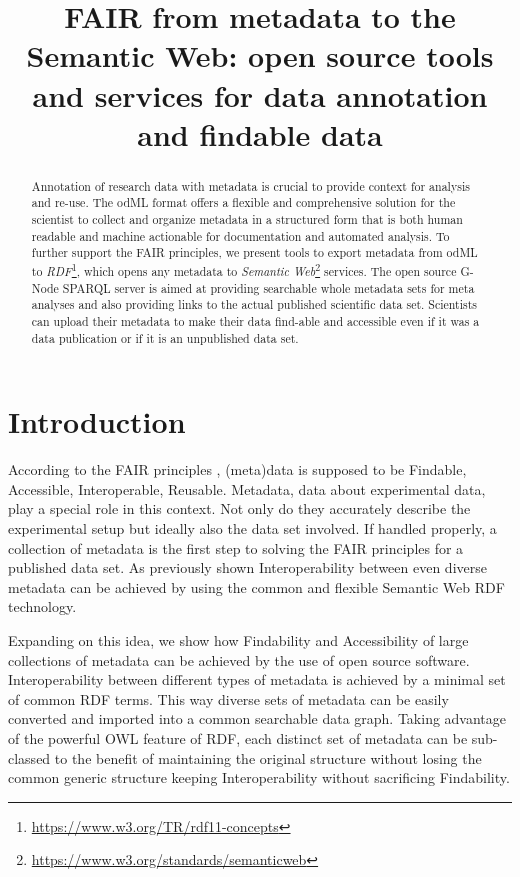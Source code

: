 \documentclass{article}
\title{FAIR from metadata to the Semantic Web: open source tools and services for data annotation and findable data}
\begin{document}
\maketitle

\begin{abstract}
Annotation of research data with metadata is crucial to provide context for analysis and  re-use. The odML format offers a flexible and comprehensive solution for the scientist to collect and organize metadata in a structured form that is both human readable and machine actionable for documentation and automated analysis. To further support the FAIR principles, we present tools to export metadata from odML to \textit{RDF}\footnote{\url{https://www.w3.org/TR/rdf11-concepts}}, which opens any metadata to \textit{Semantic Web}\footnote{\url{https://www.w3.org/standards/semanticweb}} services. The open source G-Node SPARQL server is aimed at providing searchable whole metadata sets for meta analyses and also providing links to the actual published scientific data set. Scientists can upload their metadata to make their data find-able and accessible even if it was a data publication or if it is an unpublished data set.
\end{abstract}

\section{Introduction} \label{sec:introduction}
According to the FAIR principles \cite{Wilkinson_2016}, (meta)data is supposed to be Findable, Accessible, Interoperable, Reusable. Metadata, data about experimental data, play a special role in this context. Not only do they accurately describe the experimental setup but ideally also the data set involved. If handled properly, a collection of metadata is the first step to solving the FAIR principles for a published data set. As previously shown \cite{Teeters_2017} Interoperability between even diverse metadata can be achieved by using the common and flexible Semantic Web RDF technology.

Expanding on this idea, we show how Findability and Accessibility of large collections of metadata can be achieved by the use of open source software. Interoperability between different types of metadata is achieved by a minimal set of common RDF terms. This way diverse sets of metadata can be easily converted and imported into a common searchable data graph. Taking advantage of the powerful OWL feature of RDF, each distinct set of metadata can be sub-classed to the benefit of maintaining the original structure without losing the common generic structure keeping Interoperability without sacrificing Findability.
\end{document}
